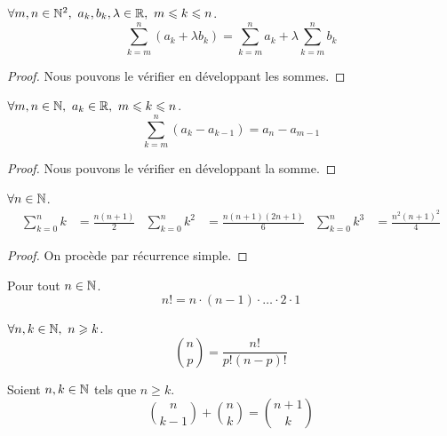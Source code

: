 \begin{proposition}
    $\forall m, n \in \mathbb{N}^2,\ a_k, b_k, \lambda \in \mathbb{R},\ m \leqslant k \leqslant n$.
    \[ \sum_{k = m}^{n} (a_k + \lambda b_k) = \sum_{k = m}^n a_k + \lambda \sum_{k = m}^n b_k \]
\end{proposition}

\begin{proof}
	Nous pouvons le vérifier en développant les sommes.
\end{proof}

\begin{proposition}
    $\forall m, n \in \mathbb{N},\ a_k \in \mathbb{R},\ m \leqslant k \leqslant n$.
    \[ \sum_{k = m}^n (a_k - a_{k - 1}) = a_n - a_{m - 1} \]
\end{proposition}

\begin{proof}
	Nous pouvons le vérifier en développant la somme.
\end{proof}

\begin{proposition}
	$\forall n \in \mathbb{N}$.
	\begin{align*}
		\sum_{k = 0}^{n} k &= \frac{n(n+1)}{2} & 
		\sum_{k = 0}^{n} k^2 &= \frac{n(n+1)(2n+1)}{6} &
		\sum_{k = 0}^{n} k^3 &= \frac{n^2(n+1)^2}{4}
	\end{align*}
\end{proposition}

\begin{proof}
	On procède par récurrence simple.
\end{proof}

\begin{definition}
	Pour tout $n \in \mathbb{N}$.
	\[ n! = n \cdot (n - 1) \cdot \ldots \cdot 2 \cdot 1 \]
\end{definition}

\begin{proposition}
	$\forall n, k \in \mathbb{N},\ n \geqslant k$.
	\[ \binom{n}{p} = \frac{n!}{p!(n - p)!} \]
\end{proposition}

\begin{proposition}
	Soient $n, k \in \mathbb{N}$ tels que $n \geq k$.
	\[
	\binom{n}{k - 1} + \binom{n}{k} = \binom{n+1}{k}
	\]
\end{proposition}

